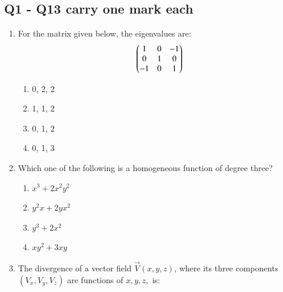 \documentclass[journal]{IEEEtran}
\theoremstyle{remark}
\begin{document}
\subsection*{Q1 - Q13 carry one mark each}
\begin{enumerate}
\item For the matrix given below, the eigenvalues are: \hfill{}
\begin{align}
    \begin{pmatrix} 1 & 0 & -1 \\ 0 & 1 & 0 \\ -1 & 0 & 1\end{pmatrix} 
\end{align}
\begin{multicols}{4}
\begin{enumerate}
\item 0, 2, 2
\item 1, 1, 2
\item 0, 1, 2
\item 0, 1, 3
\end{enumerate}
\end{multicols}

\item Which one of the following is a homogeneous function of degree three? \hfill{}
\begin{multicols}{2}
\begin{enumerate}
\item $x^{3}+2x^{2}y^{2}$
\item $y^{2}x+2yx^{2}$
\item $y^{3}+2x^{2}$
\item $xy^{2}+3xy$
\end{enumerate}
\end{multicols}

\item The divergence of a vector field $\vec{V}(x,y,z)$, where its three components $(V_{x}, V_{y}, V_{z})$ are functions of $x, y, z,$ is: \hfill{}
\begin{multicols}{2}
    


\end{multicols}
\end{enumerate}
\end{document}
